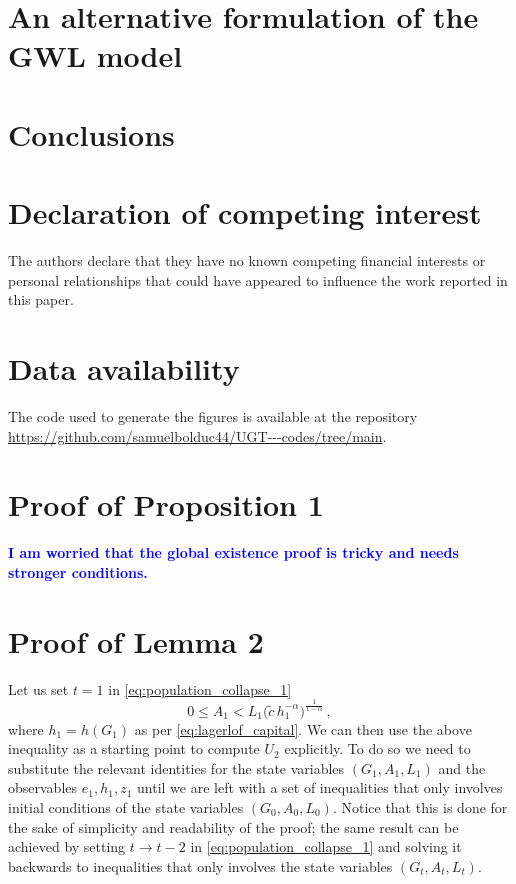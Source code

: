 \documentclass[a4paper,fleqn]{cas-sc}
\newcommand{\samb}[1]{\textcolor{blue}{\textbf{#1}}}
\begin{document}
\section{An alternative formulation of the GWL model}\label{sec:smoothing}

\section{Conclusions}\label{sec:conclusions}

\printcredits

\section*{Declaration of competing interest}
The authors declare that they have no known competing financial interests or personal relationships that could have appeared to influence the work reported in this paper.

\section*{Data availability}
The code used to generate the figures is available at the repository \url{https://github.com/samuelbolduc44/UGT---codes/tree/main}.

%




\appendix
\section{Proof of Proposition 1}\label{appenix_A}
\samb{I am worried that the global existence proof is tricky and needs stronger conditions. }
\section{Proof of Lemma 2}\label{appenix_B}
Let us set $t=1$ in \eqref{eq:population_collapse_1} 
%
\begin{equation*}
        0\leq A_1<L_1\Big(\tilde{c}\,h_1^{-\alpha}\Big)^{\frac{1}{{1-\alpha}}}\,,
\end{equation*}
%
where $h_1=h(G_1)$ as per \eqref{eq:lagerlof_capital}.
We can then use the above inequality as a starting point to compute $U_2$ explicitly.
To do so we need to substitute the relevant identities for the state variables $(G_1,A_1,L_1)$ and the observables $e_1,h_1,z_1$ until we are left with a set of inequalities that only involves initial conditions of the state variables $(G_0,A_0,L_0)$.
Notice that this is done for the sake of simplicity and readability of the proof; the same result can be achieved by setting $t\to t-2$ in \eqref{eq:population_collapse_1} and solving it backwards to inequalities that only involves the state variables $(G_t,A_t,L_t)$.
\end{document}
